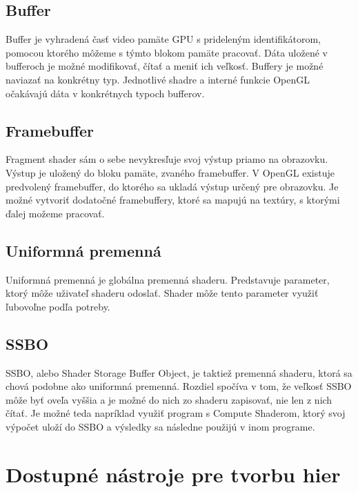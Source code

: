\subsection*{Buffer}
Buffer je vyhradená časť video pamäte GPU s prideleným identifikátorom, pomocou ktorého môžeme s týmto blokom pamäte pracovať. Dáta uložené v bufferoch je možné modifikovať, čítať a meniť ich veľkosť. Buffery je možné naviazať na konkrétny typ. Jednotlivé shadre a interné funkcie OpenGL očakávajú dáta v konkrétnych typoch bufferov. 

\subsection*{Framebuffer}
Fragment shader sám o sebe nevykresľuje svoj výstup priamo na obrazovku. Výstup je uložený do bloku pamäte, zvaného framebuffer. V OpenGL existuje predvolený framebuffer, do ktorého sa ukladá výstup určený pre obrazovku. Je možné vytvoriť dodatočné framebuffery, ktoré sa mapujú na textúry, s ktorými ďalej možeme pracovať.

\subsection*{Uniformná premenná}
Uniformná premenná je globálna premenná shaderu. Predstavuje parameter, ktorý môže uživateľ shaderu odoslať. Shader môže tento parameter využiť ľubovoľne podľa potreby.

\subsection*{SSBO}
SSBO, alebo Shader Storage Buffer Object, je taktiež premenná shaderu, ktorá sa chová podobne ako uniformná premenná. Rozdiel spočíva v tom, že veľkosť SSBO môže byť oveľa vyššia a je možné do nich zo shaderu zapisovať, nie len z nich čítať. Je možné teda napríklad využiť program s Compute Shaderom, ktorý svoj výpočet uloží do SSBO a výsledky sa následne použijú v inom programe.

\section{Dostupné nástroje pre tvorbu hier}